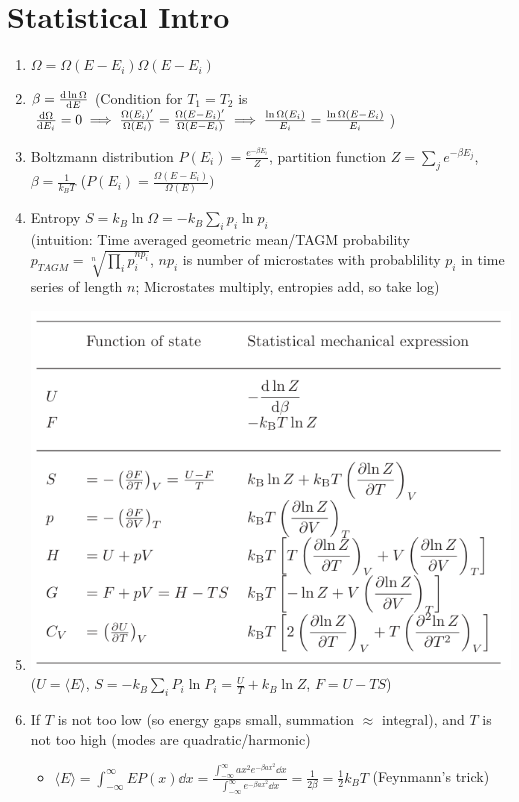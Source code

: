 \documentclass{article}
\theoremstyle{remark}
\begin{document}
\section*{Statistical Intro}
\begin{enumerate}
    \item $\Omega=\Omega(E-E_i)\Omega(E-E_i)$
    \item $\beta=\dv{\ln\Omega}{E}$\newline
        (Condition for $T_1=T_2$ is $\dv{\Omega}{E_i}=0\implies\frac{\Omega(E_i)'}{\Omega(E_i)}=\frac{\Omega(E-E_i)'}{\Omega(E-E_i)}\implies\frac{\ln\Omega(E_i)}{E_i}=\frac{\ln\Omega(E-E_i)}{E_i}$)
    \item Boltzmann distribution $P(E_i)=\frac{e^{-\beta E_i}}{Z}$, partition function $Z=\sum_{j}e^{-\beta E_j}$, $\beta=\frac{1}{k_B T}$ \newline
        ($P(E_i)=\frac{\Omega(E-E_i)}{\Omega(E)})$
    \item Entropy $S=k_B\ln\Omega=\boxed{-k_B\sum_{i}p_i\ln p_i}$ \\ (intuition: Time averaged geometric mean/TAGM probability $p_{TAGM}=\sqrt[n]{\prod_i p_i^{np_i}}$, $np_i$ is number of microstates with probablility $p_i$ in time series of length $n$; Microstates multiply, entropies add, so take log)
    \item \includegraphics*[width=0.8\linewidth]{thermodynamic_variables__function.png}\newline
        ($U=\langle E\rangle$, $S=-k_B\sum_i P_i\ln P_i=\frac{U}{T}+k_B\ln Z$, $F=U-TS$)
    \item If $T$ is not too low (so energy gaps small, summation $\approx$ integral), and $T$ is not too high (modes are quadratic/harmonic)\begin{itemize}
            \item $\langle E\rangle =\int_{-\infty}^{\infty}EP(x)\dd x=\frac{\int_{-\infty}^{\infty}ax^2e^{-\beta ax^2}\dd x}{\int_{-\infty}^{\infty}e^{-\beta ax^2}\dd x}=\frac{1}{2\beta}=\frac{1}{2}k_B T$ (Feynmann's trick)

\end{itemize}
\end{enumerate}
\end{document}
